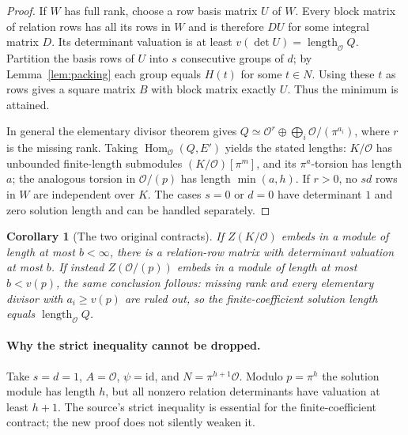 \documentclass[11pt]{article}
\newtheorem{corollary}[theorem]{Corollary}
\theoremstyle{remark}\newtheorem{remark}[theorem]{Remark}
\newcommand{\Ocal}{\mathcal O}
\newcommand{\len}{\operatorname{length}_{\Ocal}}
\newcommand{\Hom}{\operatorname{Hom}_{\Ocal}}
\begin{document}
\begin{proof}
If $W$ has full rank, choose a row basis matrix $U$ of $W$. Every block matrix of relation rows has all its rows in $W$ and is therefore $DU$ for some integral matrix $D$. Its determinant valuation is at least $v(\det U)=\len Q$. Partition the basis rows of $U$ into $s$ consecutive groups of $d$; by Lemma~\ref{lem:packing} each group equals $H(t)$ for some $t\in N$. Using these $t$ as rows gives a square matrix $B$ with block matrix exactly $U$. Thus the minimum is attained.

In general the elementary divisor theorem gives $Q\simeq\Ocal^r\oplus\bigoplus_i\Ocal/(\pi^{a_i})$, where $r$ is the missing rank. Taking $\Hom(Q,E')$ yields the stated lengths: $K/\Ocal$ has unbounded finite-length submodules $(K/\Ocal)[\pi^m]$, and its $\pi^a$-torsion has length $a$; the analogous torsion in $\Ocal/(p)$ has length $\min(a,h)$. If $r>0$, no $sd$ rows in $W$ are independent over $K$. The cases $s=0$ or $d=0$ have determinant $1$ and zero solution length and can be handled separately.
\end{proof}
\begin{corollary}[The two original contracts]
If $Z(K/\Ocal)$ embeds in a module of length at most $b<\infty$, there is a relation-row matrix with determinant valuation at most $b$. If instead $Z(\Ocal/(p))$ embeds in a module of length at most $b<v(p)$, the same conclusion follows: missing rank and every elementary divisor with $a_i\ge v(p)$ are ruled out, so the finite-coefficient solution length equals $\len Q$.
\end{corollary}
\paragraph{Why the strict inequality cannot be dropped.} Take $s=d=1$, $A=\Ocal$, $\psi=\mathrm{id}$, and $N=\pi^{h+1}\Ocal$. Modulo $p=\pi^h$ the solution module has length $h$, but all nonzero relation determinants have valuation at least $h+1$. The source's strict inequality is essential for the finite-coefficient contract; the new proof does not silently weaken it.
\end{document}
